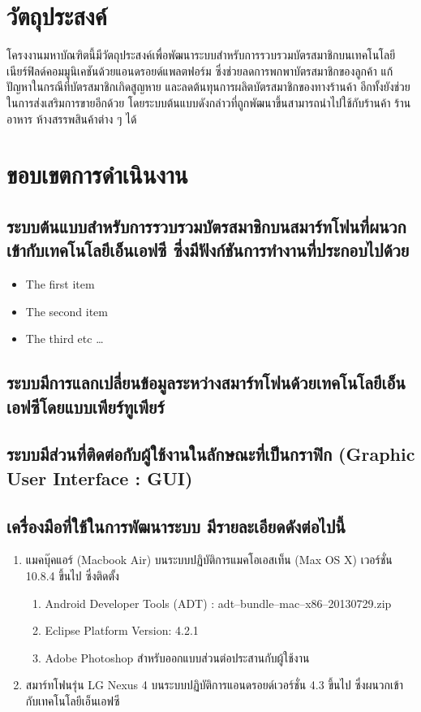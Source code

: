 \documentclass[a4paper]{article}
\begin{document}
\section{วัตถุประสงค์}
โครงงานมหาบัณฑิตนี้มีวัตถุประสงค์เพื่อพัฒนาระบบสำหรับการรวบรวมบัตรสมาชิกบนเทคโนโลยีเนียร์ฟิลด์คอมมูนิเคชันด้วยแอนดรอยด์แพลตฟอร์ม ซึ่งช่วยลดการพกพาบัตรสมาชิกของลูกค้า แก้ปัญหาในกรณีที่บัตรสมาชิกเกิดสูญหาย และลดต้นทุนการผลิตบัตรสมาชิกของทางร้านค้า อีกทั้งยังช่วยในการส่งเสริมการขายอีกด้วย โดยระบบต้นแบบดังกล่าวที่ถูกพัฒนาขึ้นสามารถนำไปใช้กับร้านค้า ร้านอาหาร ห้างสรรพสินค้าต่าง ๆ ได้

\section{ขอบเขตการดำเนินงาน}
\subsection{ระบบต้นแบบสำหรับการรวบรวมบัตรสมาชิกบนสมาร์ทโฟนที่ผนวกเข้ากับเทคโนโลยีเอ็นเอฟซี ซึ่งมีฟังก์ชันการทำงานที่ประกอบไปด้วย}
\begin{itemize}
	\item The first item
	\item The second item
	\item The third etc \ldots
\end{itemize}
\subsection{ระบบมีการแลกเปลี่ยนข้อมูลระหว่างสมาร์ทโฟนด้วยเทคโนโลยีเอ็นเอฟซีโดยแบบเพียร์ทูเพียร์}
\subsection{ระบบมีส่วนที่ติดต่อกับผู้ใช้งานในลักษณะที่เป็นกราฟิก (Graphic User Interface : GUI)}
\subsection{เครื่องมือที่ใช้ในการพัฒนาระบบ มีรายละเอียดดังต่อไปนี้}
\begin{enumerate}
	\item แมคบุ๊คแอร์ (Macbook Air) บนระบบปฏิบัติการแมคโอเอสเท็น (Max OS X) เวอร์ชั่น 10.8.4 ขึ้นไป ซึ่งติดตั้ง
	\begin{enumerate}
		\item Android Developer Tools (ADT) : adt--bundle--mac--x86--20130729.zip
		\item Eclipse Platform Version: 4.2.1
		\item Adobe Photoshop สำหรับออกแบบส่วนต่อประสานกับผู้ใช้งาน
	\end{enumerate}
  	\item สมาร์ทโฟนรุ่น LG Nexus 4 บนระบบปฏิบัติการแอนดรอยด์เวอร์ชั่น 4.3 ขึ้นไป ซึ่งผนวกเข้ากับเทคโนโลยีเอ็นเอฟซี
\end{enumerate}
\end{document}
